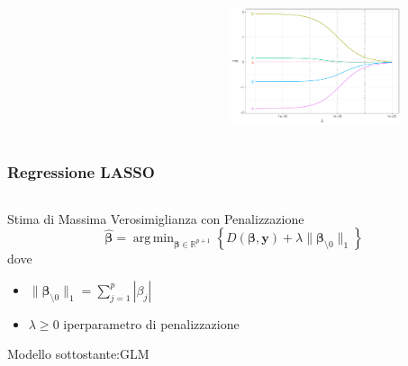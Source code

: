 \documentclass[pdf, aspectratio=169, xcolor=dvipsnames]{beamer}\usepackage[]{graphicx}\usepackage[]{color}
\DeclareMathOperator*{\argmin}{arg\,min}  %
\theoremstyle{definition}
\begin{document}
\begin{frame}
\begin{columns}[c]
\begin{column}{0.55\linewidth}
\begin{figure}
\begin{subfigure}[b]{3cm}
    \end{subfigure}
  \end{figure}
\end{column}
\begin{column}{0.45\linewidth}
  \begin{figure}
    \centering
    \includegraphics[width=5cm]{_bookdown_files/_main_files/figure-latex/ridge-lambda-5.pdf}
  \end{figure}
\end{column}
\end{columns}

\end{frame}


\begin{frame}
\frametitle{Regressione LASSO}

\fontsize{9pt}{11pt}\selectfont

\begin{columns}
\begin{column}{0.8\linewidth}
  \begin{block}{Stima di Massima Verosimiglianza con Penalizzazione}
    $$
    \hat{\boldsymbol{\beta}} = \argmin_{\boldsymbol{\beta}\in\mathbb{R}^{p+1}}{\left\{D(\boldsymbol{\beta}, \boldsymbol{y}) + \lambda \|\boldsymbol{\beta}_{\setminus0}\|_1\right\}}
    $$
    dove
    \begin{itemize}
      \item $\|\boldsymbol{\beta}_{\setminus0}\|_1 = \sum_{j=1}^p{|\beta_j|}$
      \item $\lambda\ge0$ iperparametro di penalizzazione
    \end{itemize}
    
    \vspace{0.2cm}
    
    Modello sottostante:GLM
  \end{block}
\end{column}
\end{columns}

\end{frame}
\end{document}
